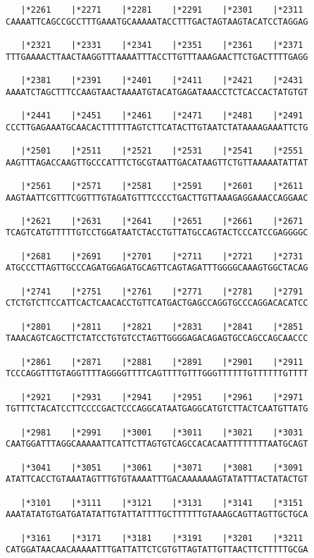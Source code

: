 \documentclass{article}
\begin{document}
\begin{Verbatim}
   |*2261    |*2271    |*2281    |*2291    |*2301    |*2311 
CAAAATTCAGCCGCCTTTGAAATGCAAAAATACCTTTGACTAGTAAGTACATCCTAGGAG
  
   |*2321    |*2331    |*2341    |*2351    |*2361    |*2371 
TTTGAAAACTTAACTAAGGTTTAAAATTTACCTTGTTTAAAGAACTTCTGACTTTTGAGG
  
   |*2381    |*2391    |*2401    |*2411    |*2421    |*2431 
AAAATCTAGCTTTCCAAGTAACTAAAATGTACATGAGATAAACCTCTCACCACTATGTGT
  
   |*2441    |*2451    |*2461    |*2471    |*2481    |*2491 
CCCTTGAGAAATGCAACACTTTTTTAGTCTTCATACTTGTAATCTATAAAAGAAATTCTG
  
   |*2501    |*2511    |*2521    |*2531    |*2541    |*2551 
AAGTTTAGACCAAGTTGCCCATTTCTGCGTAATTGACATAAGTTCTGTTAAAAATATTAT
  
   |*2561    |*2571    |*2581    |*2591    |*2601    |*2611 
AAGTAATTCGTTTCGGTTTGTAGATGTTTCCCCTGACTTGTTAAAGAGGAAACCAGGAAC
  
   |*2621    |*2631    |*2641    |*2651    |*2661    |*2671 
TCAGTCATGTTTTTGTCCTGGATAATCTACCTGTTATGCCAGTACTCCCATCCGAGGGGC
  
   |*2681    |*2691    |*2701    |*2711    |*2721    |*2731 
ATGCCCTTAGTTGCCCAGATGGAGATGCAGTTCAGTAGATTTGGGGCAAAGTGGCTACAG
  
   |*2741    |*2751    |*2761    |*2771    |*2781    |*2791 
CTCTGTCTTCCATTCACTCAACACCTGTTCATGACTGAGCCAGGTGCCCAGGACACATCC
  
   |*2801    |*2811    |*2821    |*2831    |*2841    |*2851 
TAAACAGTCAGCTTCTATCCTGTGTCCTAGTTGGGGAGACAGAGTGCCAGCCAGCAACCC
  
   |*2861    |*2871    |*2881    |*2891    |*2901    |*2911 
TCCCAGGTTTGTAGGTTTTAGGGGTTTTCAGTTTTGTTTGGGTTTTTTGTTTTTTGTTTT
  
   |*2921    |*2931    |*2941    |*2951    |*2961    |*2971 
TGTTTCTACATCCTTCCCCGACTCCCAGGCATAATGAGGCATGTCTTACTCAATGTTATG
  
   |*2981    |*2991    |*3001    |*3011    |*3021    |*3031 
CAATGGATTTAGGCAAAAATTCATTCTTAGTGTCAGCCACACAATTTTTTTTAATGCAGT
  
   |*3041    |*3051    |*3061    |*3071    |*3081    |*3091 
ATATTCACCTGTAAATAGTTTGTGTAAAATTTGACAAAAAAAGTATATTTACTATACTGT
  
   |*3101    |*3111    |*3121    |*3131    |*3141    |*3151 
AAATATATGTGATGATATATTGTATTATTTTGCTTTTTTGTAAAGCAGTTAGTTGCTGCA
  
   |*3161    |*3171    |*3181    |*3191    |*3201    |*3211 
CATGGATAACAACAAAAATTTGATTATTCTCGTGTTAGTATTGTTAACTTCTTTTTGCGA
  

\end{Verbatim}
\end{document}
